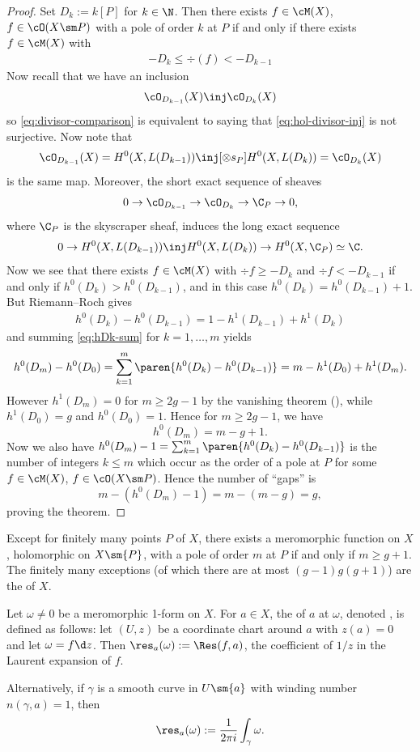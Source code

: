 \documentclass[11pt]{report}
\begin{document}
\begin{proof}
Set $D_k := k[P]$ for $k \in \N$. Then there exists $f \in \cM(X)$, $f \in \cO(X \sm P)$ with a pole of order $k$ at $P$ if and only if there exists $f \in \cM(X)$ with 
\begin{align} \label{eq:divisor-comparison}
  -D_k \leq \div (f) < -D_{k-1}  
\end{align}
Now recall that we have an inclusion
\begin{align} \label{eq:hol-divisor-inj}
\cO_{D_{k-1}}(X) \inj \cO_{D_k}(X)
\end{align}
so \eqref{eq:divisor-comparison} is equivalent to saying that \eqref{eq:hol-divisor-inj} is not surjective. Now note that
\[
\cO_{D_{k-1}}(X) = H^0(X,L(D_{k-1})) \inj[\otimes s_P] H^0(X,L(D_k)) = \cO_{D_k}(X)
\]
is the same map. Moreover, the short exact sequence of sheaves
\[
0 \to \cO_{D_{k-1}} \to \cO_{D_{k}}\to \C_P \to 0,
\]
where $\C_P$ is the skyscraper sheaf, induces the long exact sequence
\[
0 \to H^0 (X,L(D_{k-1})) \inj H^0(X,L(D_k)) \to H^0(X,\C_P) \simeq \C.
\]
Now we see that there exists $f \in \cM(X)$ with $\div f \geq -D_k$ and $\div f < -D_{k-1}$ if and only if $h^0(D_k)>h^0(D_{k-1})$, and in this case $h^0(D_k)=h^0(D_{k-1})+1$. But Riemann--Roch gives
\begin{align} \label{eq:hDk-sum}
    h^0(D_k)-h^0(D_{k-1})=1-h^1(D_{k-1})+h^1(D_k)
\end{align}
and summing \eqref{eq:hDk-sum} for $k=1,\dots,m$ yields
\[
h^0(D_m)-h^0(D_0)=\sum_{k=1}^m \paren{h^0(D_k)-h^0(D_{k-1})}=m-h^1(D_0)+h^1(D_m).
\]
However $h^1(D_m)=0$ for $m \geq 2g-1$ by the vanishing theorem (), while $h^1(D_0)=g$ and $h^0(D_0)=1$. Hence for $m \geq 2g-1$, we have
\[
h^0(D_m)=m-g+1.
\]
Now we also have $h^0(D_m)-1= \sum_{k=1}^m \paren{h^0(D_k)-h^0(D_{k-1})}$ is the number of integers $k \le m$ which occur as the order of a pole at $P$ for some $f \in \cM(X)$, $f \in \cO(X\sm P)$. Hence the number of ``gaps'' is 
\[
m-(h^0(D_m)-1)=m-(m-g)=g,
\]
proving the theorem.
\end{proof}

\begin{rmk}
Except for finitely many points $P$ of $X$, there exists a meromorphic function on $X$, holomorphic on $X \sm \{P\}$, with a pole of order $m$ at $P$ if and only if $m \geq g+1$. The finitely many exceptions (of which there are at most $(g-1)g(g+1)$) are the  of $X$.
\end{rmk}


\begin{defn}
Let $\omega \ne 0$ be a meromorphic 1-form on $X$. For $a \in X$, the  of $a$ at $\omega$, denoted , is defined as follows: let $(U,z)$ be a coordinate chart around $a$ with $z(a)=0$ and let $\omega = f\d z$. Then $\res_a(\omega):=\Res(f,a)$, the coefficient of $1/z$ in the Laurent expansion of $f$.

Alternatively, if $\gamma$ is a smooth curve in $U \sm \{a\}$ with winding number $n(\gamma,a)=1$, then $$\res_a(\omega):=\frac{1}{2\pi i}\int_\gamma \omega.$$
\end{defn}
\end{document}
